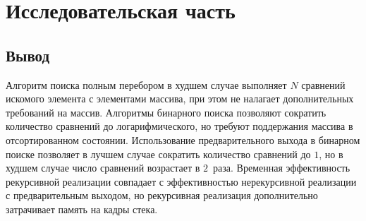 \chapter{Исследовательская часть}

\section{Вывод}
Алгоритм поиска полным перебором в худшем случае выполняет $N$ сравнений искомого элемента с элементами массива, при этом не налагает дополнительных требований на массив. Алгоритмы бинарного поиска позволяют сократить количество сравнений до логарифмического, но требуют поддержания массива в отсортированном состоянии. Использование предварительного выхода в бинарном поиске позволяет в лучшем случае сократить количество сравнений до $1$, но в худшем случае число сравнений возрастает в $2$~раза. Временная эффективность рекурсивной реализации совпадает с эффективностью нерекурсивной реализации с предварительным выходом, но рекурсивная реализация дополнительно затрачивает память на кадры стека.